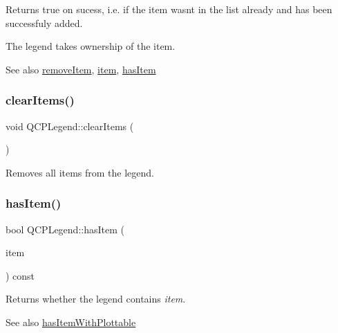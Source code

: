 Returns true on sucess, i.\+e. if the item wasn\textquotesingle{}t in the list already and has been successfuly added.

The legend takes ownership of the item.

\begin{DoxySeeAlso}{See also}
\hyperlink{class_q_c_p_legend_ac91595c3eaa746fe6321d2eb952c63bb}{remove\+Item}, \hyperlink{class_q_c_p_legend_acfe9694c45104a3359d3806ed366fcf7}{item}, \hyperlink{class_q_c_p_legend_ad0f698e33db454a6c103b5206740e599}{has\+Item} 
\end{DoxySeeAlso}
\mbox{\label{class_q_c_p_legend_a24795c7250eb5214fcea16b7217b4dfb}} 
\subsubsection{\texorpdfstring{clear\+Items()}{clearItems()}}
{\footnotesize\ttfamily void Q\+C\+P\+Legend\+::clear\+Items (\begin{DoxyParamCaption}{ }\end{DoxyParamCaption})}

Removes all items from the legend. \mbox{\label{class_q_c_p_legend_ad0f698e33db454a6c103b5206740e599}} 
\subsubsection{\texorpdfstring{has\+Item()}{hasItem()}}
{\footnotesize\ttfamily bool Q\+C\+P\+Legend\+::has\+Item (\begin{DoxyParamCaption}\item[{\hyperlink{class_q_c_p_abstract_legend_item}{Q\+C\+P\+Abstract\+Legend\+Item} $\ast$}]{item }\end{DoxyParamCaption}) const}

Returns whether the legend contains {\itshape item}.

\begin{DoxySeeAlso}{See also}
\hyperlink{class_q_c_p_legend_a4b90a442af871582df85c2bc13f91e88}{has\+Item\+With\+Plottable} 
\end{DoxySeeAlso}
\mbox{\label{class_q_c_p_legend_a4b90a442af871582df85c2bc13f91e88}} 
